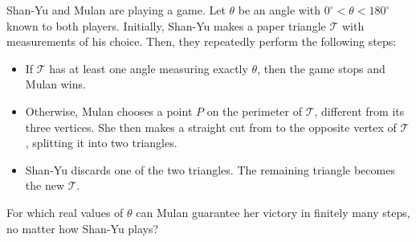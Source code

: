 Shan-Yu and Mulan are playing a game.
Let $\theta$ be an angle with $0^\circ < \theta < 180^\circ$ known to both players.
Initially, Shan-Yu makes a paper triangle $\mathcal{T}$ with measurements of his choice.
Then, they repeatedly perform the following steps:
\begin{itemize}
    \item If $\mathcal{T}$ has at least one angle measuring exactly $\theta$,
    then the game stops and Mulan wins.
    \item Otherwise, Mulan chooses a point $P$ on the perimeter of $\mathcal{T}$,
    different from its three vertices.
    She then makes a straight cut from  to the opposite vertex of $\mathcal{T}$,
    splitting it into two triangles.
    \item Shan-Yu discards one of the two triangles.
    The remaining triangle becomes the new $\mathcal{T}$.
\end{itemize}
For which real values of $\theta$ can Mulan guarantee her victory in finitely many steps,
no matter how Shan-Yu plays?

